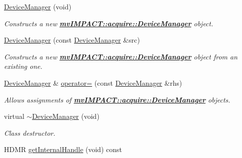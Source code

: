 \begin{DoxyCompactItemize}
\item 
\hyperlink{classmv_i_m_p_a_c_t_1_1acquire_1_1_device_manager_a4881ebceb5f5700332f204b7b2110ba7}{Device\+Manager} (void)
\begin{DoxyCompactList}\small\item\em Constructs a new {\bfseries \hyperlink{classmv_i_m_p_a_c_t_1_1acquire_1_1_device_manager}{mv\+I\+M\+P\+A\+C\+T\+::acquire\+::\+Device\+Manager}} object. \end{DoxyCompactList}\item 
\hyperlink{classmv_i_m_p_a_c_t_1_1acquire_1_1_device_manager_af3a2bb47592d848ec95b8523de851bab}{Device\+Manager} (const \hyperlink{classmv_i_m_p_a_c_t_1_1acquire_1_1_device_manager}{Device\+Manager} \&src)
\begin{DoxyCompactList}\small\item\em Constructs a new {\bfseries \hyperlink{classmv_i_m_p_a_c_t_1_1acquire_1_1_device_manager}{mv\+I\+M\+P\+A\+C\+T\+::acquire\+::\+Device\+Manager}} object from an existing one. \end{DoxyCompactList}\item 
\hypertarget{classmv_i_m_p_a_c_t_1_1acquire_1_1_device_manager_ab4583106065b5d4f8fb4be9e42962dd7}{\hyperlink{classmv_i_m_p_a_c_t_1_1acquire_1_1_device_manager}{Device\+Manager} \& \hyperlink{classmv_i_m_p_a_c_t_1_1acquire_1_1_device_manager_ab4583106065b5d4f8fb4be9e42962dd7}{operator=} (const \hyperlink{classmv_i_m_p_a_c_t_1_1acquire_1_1_device_manager}{Device\+Manager} \&rhs)}\label{classmv_i_m_p_a_c_t_1_1acquire_1_1_device_manager_ab4583106065b5d4f8fb4be9e42962dd7}

\begin{DoxyCompactList}\small\item\em Allows assignments of {\bfseries \hyperlink{classmv_i_m_p_a_c_t_1_1acquire_1_1_device_manager}{mv\+I\+M\+P\+A\+C\+T\+::acquire\+::\+Device\+Manager}} objects. \end{DoxyCompactList}\item 
virtual \hyperlink{classmv_i_m_p_a_c_t_1_1acquire_1_1_device_manager_a42765646b80c0dfe0bdca469095290bf}{$\sim$\+Device\+Manager} (void)
\begin{DoxyCompactList}\small\item\em Class destructor. \end{DoxyCompactList}\item 
\hypertarget{classmv_i_m_p_a_c_t_1_1acquire_1_1_device_manager_ad1f491bc48507740e7933e74c17da578}{H\+D\+M\+R \hyperlink{classmv_i_m_p_a_c_t_1_1acquire_1_1_device_manager_ad1f491bc48507740e7933e74c17da578}{get\+Internal\+Handle} (void) const }\label{classmv_i_m_p_a_c_t_1_1acquire_1_1_device_manager_ad1f491bc48507740e7933e74c17da578}


\end{DoxyCompactItemize}
